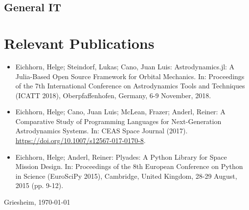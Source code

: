 \documentclass[10pt,a4paper]{moderncv}
\begin{document}
\subsection{General IT}

\section{Relevant Publications}
\begin{itemize}
    \item Eichhorn, Helge; Steindorf, Lukas; Cano, Juan Luis: Astrodynamics.jl: A Julia-Based Open Source Framework for Orbital Mechanics. In: Proceedings of the 7th International Conference on Astrodynamics Tools and Techniques (ICATT 2018), Oberpfaffenhofen, Germany, 6-9 November, 2018.
    \item Eichhorn, Helge; Cano, Juan Luis; McLean, Frazer; Anderl, Reiner: A Comparative Study of Programming Languages for Next-Generation Astrodynamics Systems. In: CEAS Space Journal (2017). \url{https://doi.org/10.1007/s12567-017-0170-8}.
    \item Eichhorn, Helge; Anderl, Reiner: Plyades: A Python Library for Space Mission Design. In: Proceedings of the 8th European Conference on Python in Science (EuroSciPy 2015), Cambridge, United Kingdom, 28-29 August, 2015 (pp. 9-12).
\end{itemize}
\bigskip
\bigskip
\bigskip
\bigskip
\bigskip

Griesheim, \today
\end{document}
